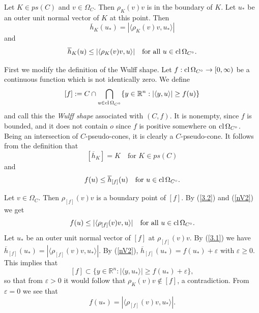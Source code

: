 \documentclass[12pt]{article}
\newcommand{\0}{\mbox{\boldmath$o$}}
\newcommand{\R}{{\mathbb R}}
\begin{document}
Let $K\in ps(C)$ and $v\in \Omega_C$. Then $\rho_K(v)v$ is in the boundary of $K$. Let $u_*$ be an outer unit normal vector of $K$ at this point. Then
\begin{equation}\label{3.1}
\overline h_K(u_*) = |\langle \rho_K(v)v, u_*\rangle|
\end{equation}
and
\begin{equation}\label{3.2}
\overline h_K(u) \le |\langle \rho_K(v)v, u\rangle|\quad\mbox{for all }u\in{\rm cl}\,\Omega_{C^\circ}.
\end{equation}

First we modify the definition of the Wulff shape. Let $f:{\rm cl}\,\Omega_{C^\circ}\to [0,\infty)$ be a continuous function which is not identically zero. We define
$$ [f]:= C\cap\bigcap_{u\in{\rm cl}\,\Omega_{C^\circ}} \{y\in\R^n: |\langle y,u\rangle| \ge f(u)\}$$
and call this the {\em Wulff shape} associated with $(C,f)$. It is nonempty, since $f$ is bounded, and it does not contain $o$ since $f$ is positive somewhere on ${\rm cl}\,\Omega_{C^\circ}$. Being an intersection of $C$-pseudo-cones, it is clearly a $C$-pseudo-cone. It follows from the definition that
\begin{equation}\label{3.2a} 
[\overline h_K]= K\quad\mbox{for }K\in ps(C)
\end{equation}
and
\begin{equation}\label{nV2}
f(u)\le \overline h_{[f]}(u) \quad\mbox{for }u\in{\rm cl}\,\Omega_{C^\circ}.
\end{equation}

Let $v\in \Omega_C$. Then $\rho_{[f]}(v)v$ is a boundary point of $[f]$. By (\ref{3.2}) and (\ref{nV2}) we get
\begin{equation}\label{3.3}
f(u)\le |\langle \rho_{[f]}(v)v,u\rangle|\quad \mbox{for all } u\in{\rm cl}\,\Omega_{C^\circ}.
\end{equation}
Let $u_*$ be an outer unit normal vector of $[f]$ at $\rho_{[f]}(v)v$. By (\ref{3.1}) we have $\overline h_{[f]}(u_*) = |\langle \rho_{[f]}(v)v,u_*\rangle|$. By (\ref{nV2}), $\overline h_{[f]}(u_*) = f(u_*)+\varepsilon$ with $\varepsilon\ge 0$. This implies that
$$ [f]\subset \{y\in\R^n: |\langle y,u_*\rangle| \ge f(u_*)+\varepsilon\},$$
so that from $\varepsilon>0$ it would follow that $\rho_K(v)v\notin [f]$, a contradiction. From $\varepsilon =0$ we see that 
\begin{equation}\label{3.4}
f(u_*) = |\langle \rho_{[f]}(v)v,u_*\rangle|.
\end{equation}
\end{document}
